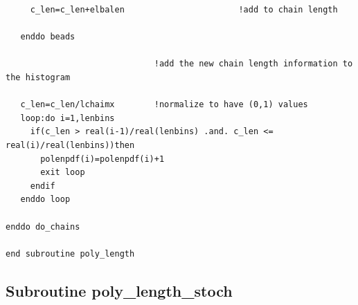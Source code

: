 \documentclass[]{article}
\begin{document}
\begin{verbatim}
     c_len=c_len+elbalen                       !add to chain length
 
   enddo beads
 
                              !add the new chain length information to the histogram
 
   c_len=c_len/lchaimx        !normalize to have (0,1) values
   loop:do i=1,lenbins
     if(c_len > real(i-1)/real(lenbins) .and. c_len <= real(i)/real(lenbins))then
       polenpdf(i)=polenpdf(i)+1
       exit loop
     endif
   enddo loop
 
enddo do_chains
 
end subroutine poly_length

\end{verbatim}

\subsection{Subroutine poly\_length\_stoch}
\end{document}
